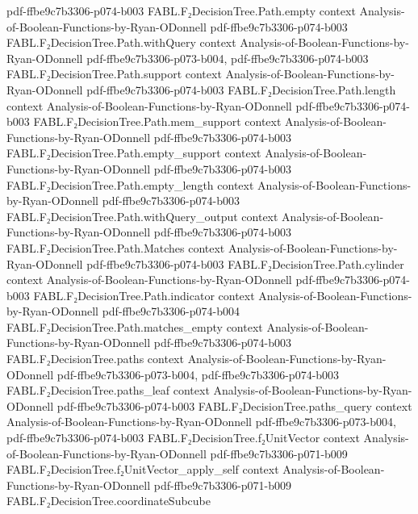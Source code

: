 \begin{theorem}
  {pdf-ffbe9c7b3306-p074-b003}
\proofstep
  {FABL.F₂DecisionTree.Path.empty}
  {context}
  {Analysis-of-Boolean-Functions-by-Ryan-ODonnell}
  {pdf-ffbe9c7b3306-p074-b003}
\proofstep
  {FABL.F₂DecisionTree.Path.withQuery}
  {context}
  {Analysis-of-Boolean-Functions-by-Ryan-ODonnell}
  {pdf-ffbe9c7b3306-p073-b004,
    pdf-ffbe9c7b3306-p074-b003}
\proofstep
  {FABL.F₂DecisionTree.Path.support}
  {context}
  {Analysis-of-Boolean-Functions-by-Ryan-ODonnell}
  {pdf-ffbe9c7b3306-p074-b003}
\proofstep
  {FABL.F₂DecisionTree.Path.length}
  {context}
  {Analysis-of-Boolean-Functions-by-Ryan-ODonnell}
  {pdf-ffbe9c7b3306-p074-b003}
\proofstep
  {FABL.F₂DecisionTree.Path.mem_support}
  {context}
  {Analysis-of-Boolean-Functions-by-Ryan-ODonnell}
  {pdf-ffbe9c7b3306-p074-b003}
\proofstep
  {FABL.F₂DecisionTree.Path.empty_support}
  {context}
  {Analysis-of-Boolean-Functions-by-Ryan-ODonnell}
  {pdf-ffbe9c7b3306-p074-b003}
\proofstep
  {FABL.F₂DecisionTree.Path.empty_length}
  {context}
  {Analysis-of-Boolean-Functions-by-Ryan-ODonnell}
  {pdf-ffbe9c7b3306-p074-b003}
\proofstep
  {FABL.F₂DecisionTree.Path.withQuery_output}
  {context}
  {Analysis-of-Boolean-Functions-by-Ryan-ODonnell}
  {pdf-ffbe9c7b3306-p074-b003}
\proofstep
  {FABL.F₂DecisionTree.Path.Matches}
  {context}
  {Analysis-of-Boolean-Functions-by-Ryan-ODonnell}
  {pdf-ffbe9c7b3306-p074-b003}
\proofstep
  {FABL.F₂DecisionTree.Path.cylinder}
  {context}
  {Analysis-of-Boolean-Functions-by-Ryan-ODonnell}
  {pdf-ffbe9c7b3306-p074-b003}
\proofstep
  {FABL.F₂DecisionTree.Path.indicator}
  {context}
  {Analysis-of-Boolean-Functions-by-Ryan-ODonnell}
  {pdf-ffbe9c7b3306-p074-b004}
\proofstep
  {FABL.F₂DecisionTree.Path.matches_empty}
  {context}
  {Analysis-of-Boolean-Functions-by-Ryan-ODonnell}
  {pdf-ffbe9c7b3306-p074-b003}
\proofstep
  {FABL.F₂DecisionTree.paths}
  {context}
  {Analysis-of-Boolean-Functions-by-Ryan-ODonnell}
  {pdf-ffbe9c7b3306-p073-b004,
    pdf-ffbe9c7b3306-p074-b003}
\proofstep
  {FABL.F₂DecisionTree.paths_leaf}
  {context}
  {Analysis-of-Boolean-Functions-by-Ryan-ODonnell}
  {pdf-ffbe9c7b3306-p074-b003}
\proofstep
  {FABL.F₂DecisionTree.paths_query}
  {context}
  {Analysis-of-Boolean-Functions-by-Ryan-ODonnell}
  {pdf-ffbe9c7b3306-p073-b004,
    pdf-ffbe9c7b3306-p074-b003}
\proofstep
  {FABL.F₂DecisionTree.f₂UnitVector}
  {context}
  {Analysis-of-Boolean-Functions-by-Ryan-ODonnell}
  {pdf-ffbe9c7b3306-p071-b009}
\proofstep
  {FABL.F₂DecisionTree.f₂UnitVector_apply_self}
  {context}
  {Analysis-of-Boolean-Functions-by-Ryan-ODonnell}
  {pdf-ffbe9c7b3306-p071-b009}
\proofstep
  {FABL.F₂DecisionTree.coordinateSubcube}

\end{theorem}
